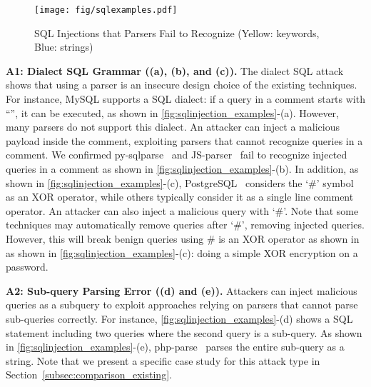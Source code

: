 \begin{figure}[h]
    \centering
    \texttt{[image: fig/sqlexamples.pdf]}
    \vspace{-1em}
     \caption{SQL Injections that Parsers Fail to Recognize (Yellow: keywords, Blue: strings)}
    \label{fig:sqlinjection_examples}
\end{figure}


\noindent
{\bf A1: Dialect SQL Grammar ((a), (b), and (c)).} 
The dialect SQL attack shows that using a parser is an insecure design choice of the existing techniques. 
For instance, MySQL supports a SQL dialect: if a query in a comment starts with ``\code{/*!}'', it can be executed, as shown in \autoref{fig:sqlinjection_examples}-(a).
However, many parsers do not support this dialect.
An attacker can inject a malicious payload inside the comment, exploiting parsers that cannot recognize queries in a comment.
We confirmed py-sqlparse~\cite{andialbrecht/sqlparse} and JS-parser~\cite{node-sql-parser} fail to recognize injected queries in a comment as shown in \autoref{fig:sqlinjection_examples}-(b).
In addition, as shown in \autoref{fig:sqlinjection_examples}-(c), PostgreSQL~\cite{PostgreSQL} considers the `\#' symbol as an XOR operator, while others typically consider it as a single line comment operator. 
An attacker can also inject a malicious query with `\#'. 
Note that some techniques may automatically remove queries after `\#', removing injected queries. However, this will break benign queries using \# is an XOR operator as shown in as shown in \autoref{fig:sqlinjection_examples}-(c): doing a simple XOR encryption on a password.


\noindent
{\bf A2: Sub-query Parsing Error ((d) and (e)).} 
Attackers can inject malicious queries as a subquery to exploit approaches relying on parsers that cannot parse sub-queries correctly.
For instance, \autoref{fig:sqlinjection_examples}-(d) shows a SQL statement including two queries where the second query is a sub-query. 
As shown in \autoref{fig:sqlinjection_examples}-(e), php-parse~\cite{phpmyadmin/sql-parser} parses the entire sub-query as a string. %
Note that we present a specific case study for this attack type in Section~\ref{subsec:comparison_existing}.


